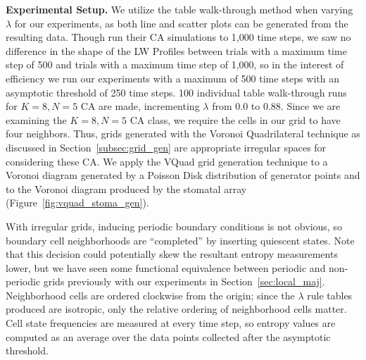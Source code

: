 \documentclass[a4paper,11pt]{article}
\begin{document}
\noindent \textbf{Experimental Setup.} We utilize the table walk-through method when varying $\lambda$ for our experiments, as both line and scatter plots can be generated from the resulting data. Though \citeauthor{wo90} run their CA simulations to 1,000 time steps, we saw no difference in the shape of the LW Profiles between trials with a maximum time step of 500 and trials with a maximum time step of 1,000, so in the interest of efficiency we run our experiments with a maximum of 500 time steps with an asymptotic threshold of 250 time steps. 100 individual table walk-through runs for $K=8, N=5$ CA are made, incrementing $\lambda$ from $0.0$ to $0.88$. Since we are examining the $K=8, N=5$ CA class, we require the cells in our grid to have four neighbors. Thus, grids generated with the Voronoi Quadrilateral technique as discussed in Section~\ref{subsec:grid_gen} are appropriate irregular spaces for considering these CA. We apply the VQuad grid generation technique to a Voronoi diagram generated by a Poisson Disk distribution of generator points and to the Voronoi diagram produced by the stomatal array (Figure~\ref{fig:vquad_stoma_gen}).

With irregular grids, inducing periodic boundary conditions is not obvious, so boundary cell neighborhoods are ``completed'' by inserting quiescent states. Note that this decision could potentially skew the resultant entropy measurements lower, but we have seen some functional equivalence between periodic and non-periodic grids previously with our experiments in Section~\ref{sec:local_maj}. Neighborhood cells are ordered clockwise from the origin; since the $\lambda$ rule tables produced are isotropic, only the relative ordering of neighborhood cells matter. Cell state frequencies are measured at every time step, so entropy values are computed as an average over the data points collected after the asymptotic threshold.
\end{document}
